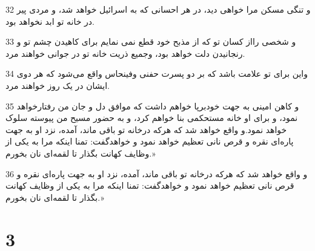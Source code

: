 \par 32 و تنگی مسکن مرا خواهی دید، در هر احسانی که به اسرائیل خواهد شد، و مردی پیر در خانه تو ابد نخواهد بود.
\par 33 و شخصی رااز کسان تو که از مذبح خود قطع نمی نمایم برای کاهیدن چشم تو و رنجانیدن دلت خواهد بود، وجمیع ذریت خانه تو در جوانی خواهند مرد.
\par 34 واین برای تو علامت باشد که بر دو پسرت حفنی وفینحاس واقع می‌شود که هر دوی ایشان در یک روز خواهند مرد.
\par 35 و کاهن امینی به جهت خودبرپا خواهم داشت که موافق دل و جان من رفتارخواهد نمود، و برای او خانه مستحکمی بنا خواهم کرد، و به حضور مسیح من پیوسته سلوک خواهد نمود.و واقع خواهد شد که هر‌که درخانه تو باقی ماند، آمده، نزد او به جهت پاره‌ای نقره و قرص نانی تعظیم خواهد نمود و خواهدگفت: تمنا اینکه مرا به یکی از وظایف کهانت بگذار تا لقمه‌ای نان بخورم.»
\par 36 و واقع خواهد شد که هر‌که درخانه تو باقی ماند، آمده، نزد او به جهت پاره‌ای نقره و قرص نانی تعظیم خواهد نمود و خواهدگفت: تمنا اینکه مرا به یکی از وظایف کهانت بگذار تا لقمه‌ای نان بخورم.»
 
\chapter{3}

